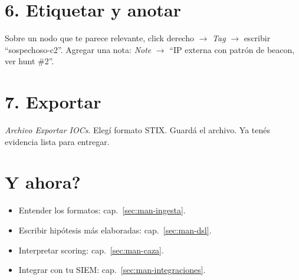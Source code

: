 \section{6. Etiquetar y anotar}

Sobre un nodo que te parece relevante, click derecho $\to$
\emph{Tag} $\to$ escribir ``sospechoso-c2''. Agregar una nota:
\emph{Note} $\to$ ``IP externa con patrón de beacon, ver
hunt \#2''.

\section{7. Exportar}

\emph{Archivo \textrightarrow{} Exportar \textrightarrow{} IOCs}.
Elegí formato STIX. Guardá el archivo. Ya tenés evidencia lista
para entregar.

\section{Y ahora?}

\begin{itemize}
    \item Entender los formatos: cap.~\ref{sec:man-ingesta}.
    \item Escribir hipótesis más elaboradas: cap.~\ref{sec:man-dsl}.
    \item Interpretar scoring: cap.~\ref{sec:man-caza}.
    \item Integrar con tu SIEM: cap.~\ref{sec:man-integraciones}.
\end{itemize}
